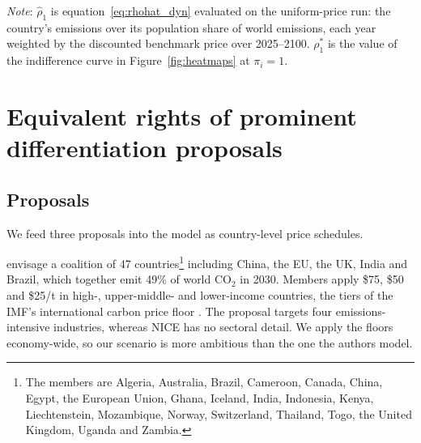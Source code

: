 \documentclass[12pt,english]{article}
\theoremstyle{remark}
\begin{document}
\begin{table}[tbp]
\centering
\small
\singlespacing
\begin{threeparttable}
\caption{Allocation at which each country is indifferent when the autarky price equals the benchmark ($\pi_i=1$).}
\label{tab:summary}
\begin{tablenotes}\footnotesize
  \item \emph{Note}: $\hat\rho_1$ is equation~\eqref{eq:rhohat_dyn} evaluated on the uniform-price run: the country's emissions over its population share of world emissions, each year weighted by the discounted benchmark price over 2025--2100. $\rho^*_1$ is the value of the indifference curve in Figure~\ref{fig:heatmaps} at $\pi_i = 1$.
\end{tablenotes}
\end{threeparttable}
\end{table}

\section{Equivalent rights of prominent differentiation proposals}
\label{sec:proposals}

\subsection{Proposals}

We feed three proposals into the model as country-level price schedules.

\citet{wolfram_building_2025} envisage a coalition of 47 countries\footnote{The members are Algeria, Australia, Brazil, Cameroon, Canada, China, Egypt, the European Union, Ghana, Iceland, India, Indonesia, Kenya, Liechtenstein, Mozambique, Norway, Switzerland, Thailand, Togo, the United Kingdom, Uganda and Zambia.} including China, the EU, the UK, India and Brazil, which together emit 49\% of world CO$_2$ in 2030. Members apply \$75, \$50 and \$25/t in high-, upper-middle- and lower-income countries, the tiers of the IMF's international carbon price floor \citep{parry_proposal_2021}. The proposal targets four emissions-intensive industries, whereas NICE has no sectoral detail. We apply the floors economy-wide, so our scenario is more ambitious than the one the authors model.
\end{document}
